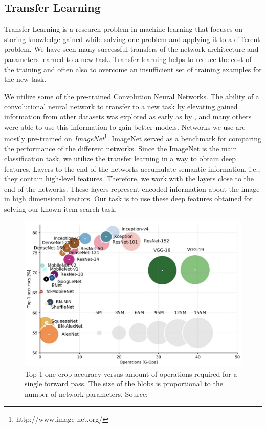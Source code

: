 
\subsection{Transfer Learning}

Transfer Learning is a research problem in machine learning that focuses on storing knowledge gained while solving one problem and applying it to a different problem. We have seen many successful transfers of the network architecture and parameters learned to a new task. Transfer learning helps to reduce the cost of the training and often also to overcome an insufficient set of training examples for the new task.

We utilize some of the pre-trained Convolution Neural Networks. The ability of a convolutional neural network to transfer to a new task by elevating gained information from other datasets was explored as early as by \cite{donahuedeep}, and many others were able to use this information to gain better models.  Networks we use are mostly pre-trained on \emph{ImageNet}\footnote{http://www.image-net.org/}. ImageNet served as a benchmark for comparing the performance of the different networks. Since the ImageNet is the main classification task, we utilize the transfer learning in a way to obtain deep features. Layers to the end of the networks accumulate semantic information, i.e., they contain high-level features. Therefore, we work with the layers close to the end of the networks. These layers represent encoded information about the image in high dimensional vectors. Our task is to use these deep features obtained for solving our known-item search task.



\begin{figure}
    \centering
	\includegraphics[width=0.8\linewidth]{img/network-comparison.jpeg}
	\caption{Top-1 one-crop accuracy versus amount of operations required for a single forward pass. The size of the blobs is proportional to the number of network parameters. Source: \cite{canziani2016analysis}}
	\label{fig:camera-setup}
\end{figure}

